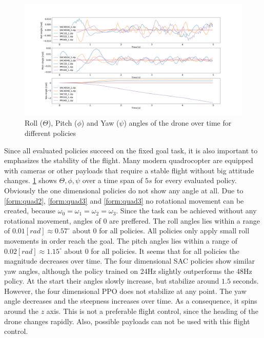 \newpage

\begin{figure}
	\centering
	\includegraphics[width=\linewidth]{figures/angles.png}
	\caption{Roll ($\Theta$), Pitch ($\phi$) and Yaw ($\psi$) angles of the drone over time 
	for different policies}
	\label{fig:angles}
\end{figure}
Since all evaluated policies succeed on the fixed goal task, it is 
also important to emphasizes the stability of the flight.
Many modern quadrocopter are equipped with cameras or other payloads
that require a stable flight without big attitude changes.
\cref{fig:angles} shows $\Theta, \phi, \psi$ over a time span of $5s$ for
every evaluated policy.
Obviously the one dimensional policies do not show any angle at all.
Due to \cref{form:quad2}, \cref{form:quad3} and \cref{form:quad3}
no rotational movement can be created, because $\omega_0 = \omega_1 = \omega_2 = \omega_3$.
Since the task can be achieved without any rotational movement, angles of $0$ are preffered.
The roll angles lies within a range of $0.01[rad] \approx 0.57^{\circ}$ about 
$0$ for all policies. All policies only apply small roll movements in order
reach the goal.
The pitch angles lies within a range of $0.02[rad] \approx 1.15^{\circ}$ about 
$0$ for all policies. 
It seems that for all policies the magnitude decreases over time.
The four dimensional SAC policies show similar yaw angles, although
the policy trained on 24Hz slightly outperforms the 48Hz policy.
At the start their angles slowly increase, but stabilize around $1.5$ seconds.
However, the four dimensional PPO does not stabilize at any point.
The yaw angle decreases and the steepness increases over time.
As a consequence, it spins around the $z$ axis. This is not a
preferable flight control, since the heading of the drone changes
rapidly. Also, possible payloads can not be used
with this flight control.


